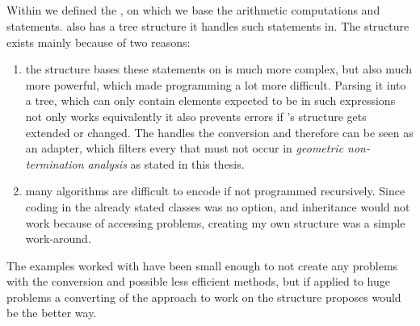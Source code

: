 \subsection{\rpntree}
Within  we defined the \rpntree, on which we base the arithmetic computations and statements. \aprove also has a tree structure it handles such statements in. The \rpntree structure exists mainly because of two reasons:
\begin{enumerate}
	\item the structure \aprove bases these statements on is much more complex, but also much more powerful, which made programming a lot more difficult. Parsing it into a tree, which can only contain elements expected to be in such expressions not only works equivalently it also prevents errors if \aprove's structure gets extended or changed. The  handles the conversion and therefore can be seen as an adapter, which filters every \its that must not occur in \textit{geometric non-termination analysis} as stated in this thesis.
	\item many algorithms are difficult to encode if not programmed recursively. Since coding in the already stated classes was no option, and inheritance would not work because of accessing problems, creating my own structure was a simple work-around.
\end{enumerate}
The examples worked with have been small enough to not create any problems with the conversion and possible less efficient methods, but if applied to huge problems a converting of the approach to work on the structure \aprove proposes would be the better way.